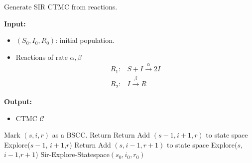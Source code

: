 \begin{algorithm}[H]
    \caption{Generate SIR CTMC from reactions.}
    \label{alg:gen-sir-ctmc}
    \footnotesize{
        \hspace*{\algorithmicindent} \textbf{Input:}
        \begin{itemize}
            \item $(S_0, I_0, R_0)$: initial population.
            \item Reactions of rate $\alpha,\beta$
                  \begin{align*}
                      R_1: & S + I \xrightarrow{\alpha} 2I \\
                      R_2: & I     \xrightarrow{\beta} R
                  \end{align*}
        \end{itemize}
        \hspace*{\algorithmicindent} \textbf{Output:}
        \begin{itemize}
            \item CTMC $\mathcal{C}$
        \end{itemize}
    }
    \begin{algorithmic}[1]
        \State Mark $(s,i,r)$ as a BSCC.
        \State Return
        \EndIf
        \State Return
        \EndIf
        \State Add $(s-1, i+1, r)$ to state space
        \State Explore($s-1$, $i+1$,$r$)
        \EndIf
        \State Return
        \EndIf
        \State Add $(s, i-1, r+1)$ to state space
        \State Explore($s$, $i-1$,$r+1$)
        \EndIf
        \EndProcedure
        \State Sir-Explore-Statespace$(s_0,i_0,r_0)$
        \EndProcedure
    \end{algorithmic}
\end{algorithm}

